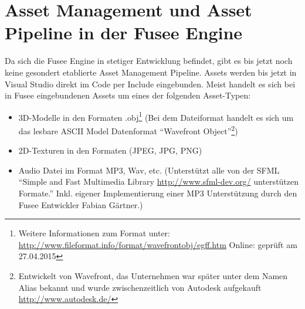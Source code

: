 \documentclass[pagesize, paper=a4, fontsize=12pt, titlepage=true, headings=small, headnosepline, abstractoff, liststotoc, nochapterprefix, plainheadsepline, twoside]{scrreprt}
\begin{document}
\section{Asset Management und Asset Pipeline in der Fusee Engine}
Da sich die Fusee Engine in stetiger Entwicklung befindet, gibt es bis jetzt noch keine gesondert etablierte Asset Management Pipeline. Assets werden bis jetzt in Visual Studio direkt im Code per Include eingebunden. Meist handelt es sich bei in Fusee eingebundenen Assets um eines der folgenden Asset-Typen:
\begin{itemize}
\item 3D-Modelle in den Formaten .obj\footnote{Weitere Informationen zum Format unter: \url{http://www.fileformat.info/format/wavefrontobj/egff.htm} Online: geprüft am 27.04.2015} (Bei dem Dateiformat handelt es sich um das lesbare ASCII Model Datenformat “Wavefront Object”\footnote{Entwickelt von Wavefront, das Unternehmen war später unter dem Namen Alias bekannt und wurde zwischenzeitlich von Autodesk aufgekauft \url{http://www.autodesk.de/}})
\item 2D-Texturen in den Formaten (JPEG, JPG, PNG)
\item Audio Datei im Format MP3, Wav, etc. (Unterstützt alle von der SFML “Simple and Fast Multimedia Library \url{http://www.sfml-dev.org/} unterstützen Formate.” Inkl. eigener Implementierung einer MP3 Unterstützung durch den Fusee Entwickler Fabian Gärtner.)
\end{itemize}
\end{document}
